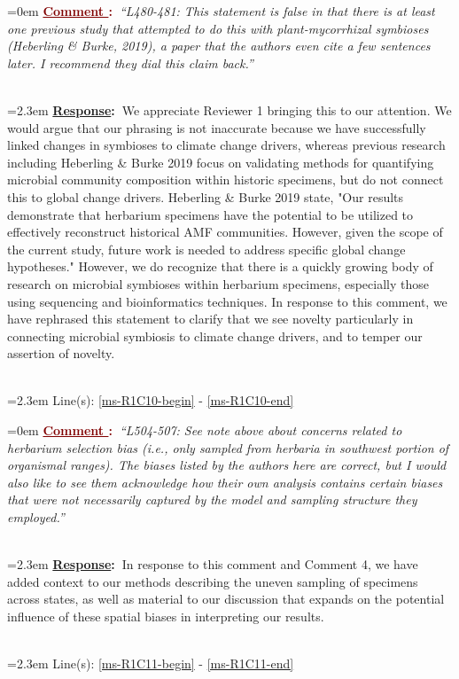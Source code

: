 \documentclass[12pt]{article}
\newcounter{cN}
\newcommand{\comment}[1]{
	\vspace{2em}
	\refstepcounter{cN} %
	\noindent \hangindent=0em \textbf{\textcolor{Maroon}{\uline{Comment \thecN}:~}}\emph{``#1''}
	}
\newcommand{\response}[1]{
	\\[0.25em]
	\hangindent=2.3em \textbf{\textcolor{NavyBlue}{\uline{Response}:~}}#1
	}
\newcommand{\linesref}[2]{
		\\[0.25em]
	\hangindent=2.3em {\color{Mahogany} Line(s): \ref{#1} - \ref{#2}}
}
\begin{document}
\comment{L480-481: This statement is false in that there is at least one previous study that attempted to do this with plant-mycorrhizal symbioses (Heberling \& Burke, 2019), a paper that the authors even cite a few sentences later. I recommend they dial this claim back.}
\response{We appreciate Reviewer 1 bringing this to our attention. We would argue that our phrasing is not inaccurate because we have successfully linked changes in symbioses to climate change drivers, whereas previous research including Heberling \& Burke 2019 focus on validating methods for quantifying microbial community composition within historic specimens, but do not connect this to global change drivers. Heberling \& Burke 2019 state, "Our results demonstrate that herbarium specimens have the potential to be utilized to effectively reconstruct historical AMF communities. However, given the scope of the current study, future work is needed to address specific global change hypotheses." However, we do recognize that there is a quickly growing body of research on microbial symbioses within herbarium specimens, especially those using sequencing and bioinformatics techniques. In response to this comment, we have rephrased this statement to clarify that we see novelty particularly in connecting microbial symbiosis to climate change drivers, and to temper our assertion of novelty.}
\linesref{ms-R1C10-begin}{ms-R1C10-end}


\comment{L504-507: See note above about concerns related to herbarium selection bias (i.e., only sampled from herbaria in southwest portion of organismal ranges). The biases listed by the authors here are correct, but I would also like to see them acknowledge how their own analysis contains certain biases that were not necessarily captured by the model and sampling structure they employed.}
\response{In response to this comment and Comment 4, we have added context to our methods describing the uneven sampling of specimens across states, as well as material to our discussion that expands on the potential influence of these spatial biases in interpreting our results.}
\linesref{ms-R1C11-begin}{ms-R1C11-end}
\end{document}
